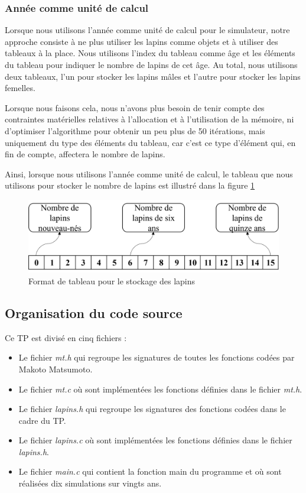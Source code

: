 \documentclass[12pt]{article}
\begin{document}
            \subsubsection{Année comme unité de calcul}
            Lorsque nous utilisons l'année comme unité de calcul pour le simulateur, notre approche consiste à ne plus utiliser les lapins comme objets et à utiliser des tableaux à la place. Nous utilisons l'index du tableau comme âge et les éléments du tableau pour indiquer le nombre de lapins de cet âge. Au total, nous utilisons deux tableaux, l'un pour stocker les lapins mâles et l'autre pour stocker les lapins femelles.
            \par
            Lorsque nous faisons cela, nous n'avons plus besoin de tenir compte des contraintes matérielles relatives à l'allocation et à l'utilisation de la mémoire, ni d'optimiser l'algorithme pour obtenir un peu plus de 50 itérations, mais uniquement du type des éléments du tableau, car c'est ce type d'élément qui, en fin de compte, affectera le nombre de lapins.
            \par
            Ainsi, lorsque nous utilisons l'année comme unité de calcul, le tableau que nous utilisons pour stocker le nombre de lapins est illustré dans la figure \ref{fig:rabbit}
            \begin{figure}[htbp]
                \centering
                \includegraphics[scale=0.75]{Photos/Rabbit.png}
                \caption{Format de tableau pour le stockage des lapins}
                \label{fig:rabbit}
            \end{figure}

            \subsection{Organisation du code source}
	Ce TP est divisé en cinq fichiers :
	\begin{itemize}
	    \item Le fichier \emph{mt.h} qui regroupe les signatures de toutes les fonctions codées par Makoto Matsumoto.
	    \item Le fichier \emph{mt.c} où sont implémentées les fonctions définies dans le fichier \emph{mt.h}.
	    \item Le fichier \emph{lapins.h} qui regroupe les signatures des fonctions codées dans le cadre du TP.
	    \item Le fichier \emph{lapins.c} où sont implémentées les fonctions définies dans le fichier \emph{lapins.h}.
	    \item Le fichier \emph{main.c} qui contient la fonction main du programme et où sont réalisées dix simulations sur vingts ans.
	\end{itemize}
            
\end{document}
